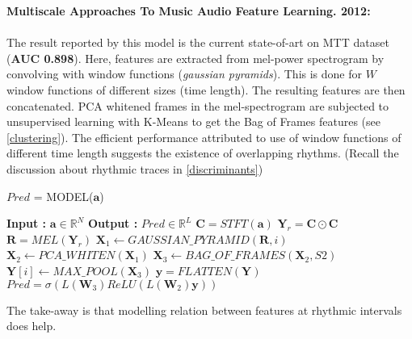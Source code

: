 \noindent \textbf{Multiscale Approaches To Music Audio Feature Learning. 2012\cite{MultiScale}:}\\
\\
\noindent The result reported by this model is the current state-of-art on MTT dataset (\textbf{AUC 0.898}). Here, features are extracted from mel-power spectrogram by convolving with window functions (\textit{gaussian pyramids}). This is done for $\textit{W}$ window functions of different sizes (time length). The resulting features are then concatenated. PCA whitened frames in the mel-spectrogram are subjected to unsupervised learning with K-Means to get the Bag of Frames features (see \ref{clustering}). The efficient performance attributed to use of window functions of different time length suggests the existence of overlapping rhythms. (Recall the discussion about rhythmic traces in \ref{discriminants}) 
\begin{algorithm}
  \caption{$Pred$ = MODEL($\textbf{a}$) }\label{multiscale}
  \begin{algorithmic}[1]
    \Statex \textbf{Input :} $\textbf{a} \in \mathbb{R}^{N}$
    \Statex \textbf{Output :} $Pred \in \mathbb{R}^{L}$ 
    \State $\textbf{C} = STFT(\textbf{a})$ 
    \State $\textbf{Y}_{r} = \textbf{C} \odot \textbf{C}$ 
    \State $\textbf{R} = MEL(\textbf{Y}_{r})$ 
     \State $\textbf{X}_{1} \leftarrow GAUSSIAN\_PYRAMID(\textbf{R},i)$ 
    \State $\textbf{X}_{2} \leftarrow PCA\_WHITEN(\textbf{X}_{1})$ 
     \State $\textbf{X}_{3} \leftarrow BAG\_OF\_FRAMES(\textbf{X}_{2},S2)$ 
    \State $\textbf{Y}[i] \leftarrow MAX\_POOL(\textbf{X}_{3})$ 
    \EndFor
    \State $\textbf{y} = FLATTEN(\textbf{Y})$ 
    \State $Pred = \sigma(L(\textbf{W}_{3})ReLU(L(\textbf{W}_{2})\textbf{y}))$ 
  \end{algorithmic}
\end{algorithm}
\FloatBarrier
\noindent The take-away is that modelling relation between features at rhythmic intervals does help.

